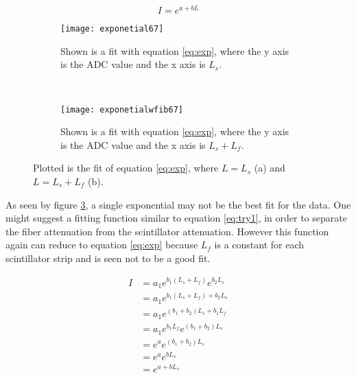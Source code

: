 \begin{equation}
    I = e^{a + bL}
    \label{eq:exp}
\end{equation}

\begin{figure}[h]
    \centering
    \begin{subfigure}[h]{0.4\textwidth}
        \texttt{[image: exponetial67]}
        \caption{Shown is a fit with equation \ref{eq:exp}, where the y axis is the ADC value and the x axis is $L_{s}$.}
        \label{fig:exponential67}
    \end{subfigure}
    ~
    \begin{subfigure}[h]{0.4\textwidth}
        \texttt{[image: exponetialwfib67]}
        \caption{Shown is a fit with equation \ref{eq:exp}, where the y axis is the ADC value and the x axis is $L_{s} + L_{f}$.}
        \label{fig:exponentialwfib67}
    \end{subfigure}
    \caption{Plotted is the fit of equation \ref{eq:exp}, where $L = L_{s}$ (a) and $L = L_{s} + L_{f}$ (b).}
    \label{fig:expfit}
\end{figure}

As seen by figure \ref{fig:expfit}, a single exponential may not be the best fit for the data.
One might suggest a fitting function similar to equation \ref{eq:try1}, in order to separate the fiber 
attenuation from the scintillator attenuation.
However this function again can reduce to equation \ref{eq:exp} because $L_{f}$ is a constant for each 
scintillator strip and is seen not to be a good fit.


\begin{equation}
    \begin{split}
        I &= a_{1}e^{b_{1}(L_{s} + L_{f})}e^{b_{2}L_{s}} \\
          &= a_{1}e^{b_{1}(L_{s} + L_{f}) + b_{2}L_{s}} \\
          &= a_{1}e^{(b_{1} + b_{2})L_{s} + b_{1}L_{f}} \\
          &= a_{1}e^{b_{1}L_{f}}e^{(b_{1} + b_{2})L_{s}} \\
          &= e^{a}e^{(b_{1} + b_{2})L_{s}} \\
          &= e^{a}e^{bL_{s}} \\
          &= e^{a + bL_{s}} \\
    \end{split}
    \label{eq:try1}
\end{equation}

